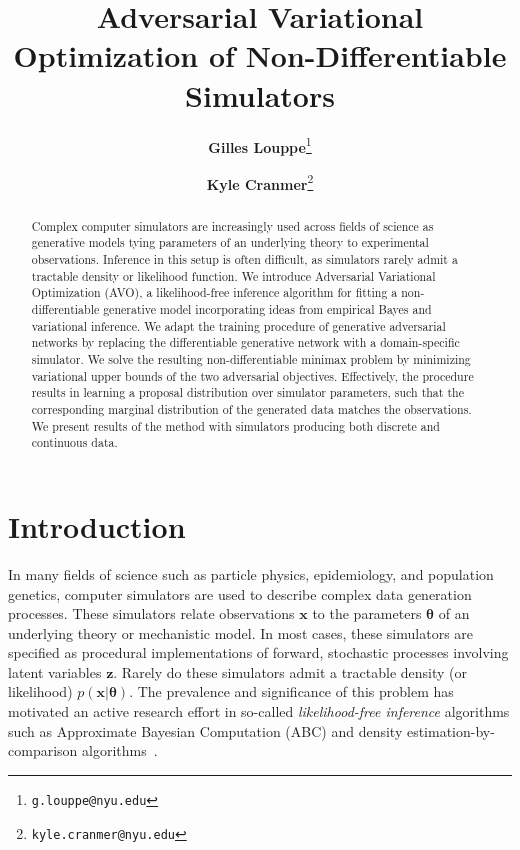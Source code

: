 \documentclass[twocolumn,superscriptaddress,aps]{revtex4-1}
\newcommand{\bftheta}{{\bm \theta}}
\newcommand{\bfx}{\mathbf{x}}
\newcommand{\bfz}{\mathbf{z}}
\theoremstyle{plain}
\begin{document}

\title{\Large{Adversarial Variational Optimization of Non-Differentiable Simulators}}
\vspace{1cm}
\author{\small{\bf Gilles Louppe}\thanks{\texttt{g.louppe@nyu.edu}}}
\author{\small{\bf Kyle Cranmer}\thanks{\texttt{kyle.cranmer@nyu.edu}}}

\begin{abstract}

Complex computer simulators are increasingly used across fields of science as
generative models tying parameters of an underlying theory to
experimental observations. Inference in this setup is often
difficult, as simulators rarely admit a tractable density or likelihood
function. We introduce Adversarial Variational Optimization (AVO), a likelihood-free
inference algorithm for fitting a non-differentiable generative model incorporating ideas from empirical Bayes and variational inference.
We adapt the training procedure of generative
adversarial networks by replacing the differentiable generative network with a
domain-specific simulator. We solve the resulting non-differentiable
minimax problem by minimizing variational upper bounds of the two adversarial objectives.
Effectively, the procedure results in learning a
proposal distribution over simulator parameters, such that the corresponding
marginal distribution of the generated data matches the observations.
We present results of the method with simulators producing both discrete and continuous data.

\end{abstract}

\maketitle


\section{Introduction}


In many fields of science such as particle physics, epidemiology,  and population
genetics, computer simulators are used to describe complex data generation processes. These simulators relate
observations $\bfx$ to the parameters $\bftheta$ of an underlying theory or mechanistic model.
In most cases, these simulators are specified as procedural implementations of forward, stochastic processes involving latent variables $\bfz$.
Rarely do these simulators admit a tractable density (or likelihood) $p(\bfx |
\bftheta)$. The prevalence and significance of this problem has motivated an
active research effort in so-called \textit{likelihood-free inference}
algorithms such as Approximate Bayesian Computation
(ABC) and density estimation-by-comparison algorithms~\cite{beaumont2002approximate, marjoram2003markov, sisson2007sequential,
sisson2011likelihood, marin2012approximate, cranmer2015approximating}.
\end{document}
